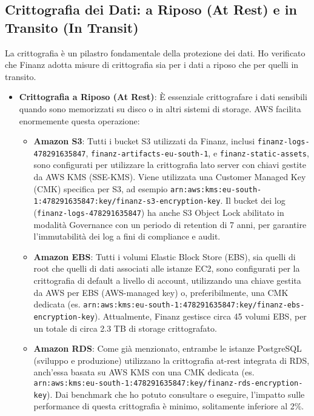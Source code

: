\subsection{Crittografia dei Dati: a Riposo (At Rest) e in Transito (In Transit)}
\label{subsec:encryption_cap2}
La crittografia è un pilastro fondamentale della protezione dei dati. Ho verificato che Finanz adotta misure di crittografia sia per i dati a riposo che per quelli in transito.
\begin{itemize}
    \item \textbf{Crittografia a Riposo (At Rest)}: È essenziale crittografare i dati sensibili quando sono memorizzati su disco o in altri sistemi di storage. AWS facilita enormemente questa operazione:
        \begin{itemize}
            \item \textbf{Amazon S3}: Tutti i bucket S3 utilizzati da Finanz, inclusi \texttt{finanz-logs-478291635847}, \texttt{finanz-artifacts-eu-south-1}, e \texttt{finanz-static-assets}, sono configurati per utilizzare la crittografia lato server con chiavi gestite da AWS KMS (SSE-KMS). Viene utilizzata una Customer Managed Key (CMK) specifica per S3, ad esempio \texttt{arn:aws:kms:eu-south-1:478291635847:key/finanz-s3-encryption-key}. Il bucket dei log (\texttt{finanz-logs-478291635847}) ha anche S3 Object Lock abilitato in modalità Governance con un periodo di retention di 7 anni, per garantire l'immutabilità dei log a fini di compliance e audit.
            \item \textbf{Amazon EBS}: Tutti i volumi Elastic Block Store (EBS), sia quelli di root che quelli di dati associati alle istanze EC2, sono configurati per la crittografia di default a livello di account, utilizzando una chiave gestita da AWS per EBS (AWS-managed key) o, preferibilmente, una CMK dedicata (es. \texttt{arn:aws:kms:eu-south-1:478291635847:key/finanz-ebs-encryption-key}). Attualmente, Finanz gestisce circa 45 volumi EBS, per un totale di circa 2.3 TB di storage crittografato.
            \item \textbf{Amazon RDS}: Come già menzionato, entrambe le istanze PostgreSQL (sviluppo e produzione) utilizzano la crittografia at-rest integrata di RDS, anch'essa basata su AWS KMS con una CMK dedicata (es. \texttt{arn:aws:kms:eu-south-1:478291635847:key/finanz-rds-encryption-key}). Dai benchmark che ho potuto consultare o eseguire, l'impatto sulle performance di questa crittografia è minimo, solitamente inferiore al 2\%.
        \end{itemize}

\end{itemize}
